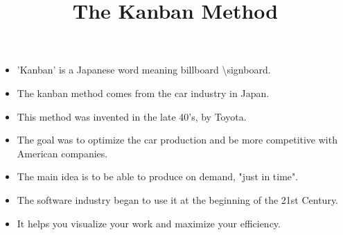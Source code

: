 \documentclass{beamer}
\title{The Kanban Method}
\begin{document}
    
\begin{frame}

    \maketitle

\end{frame}
\begin{frame}
    \begin{itemize}
        \item 'Kanban' is a Japanese word meaning billboard \textbackslash signboard. 
        \item The kanban method comes from the car industry in Japan.
        \item This method was invented in the late 40's, by Toyota.
        \item The goal was to optimize the car production and be more competitive with American companies.
        \item The main idea is to be able to produce on demand, "just in time".
        \item The software industry began to use it at the beginning of the 21st Century.
        \item It helps you visualize your work and maximize your efficiency.
    \end{itemize}  

\end{frame}
\end{document}
